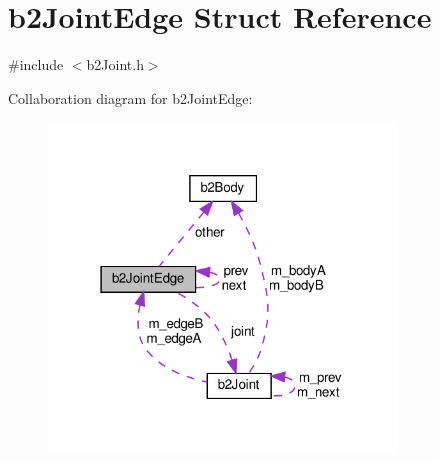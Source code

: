 \hypertarget{structb2JointEdge}{}\section{b2\+Joint\+Edge Struct Reference}
\label{structb2JointEdge}


{\ttfamily \#include $<$b2\+Joint.\+h$>$}



Collaboration diagram for b2\+Joint\+Edge\+:
\nopagebreak
\begin{figure}[H]
\begin{center}
\leavevmode
\includegraphics[width=262pt]{structb2JointEdge__coll__graph}
\end{center}
\end{figure}
